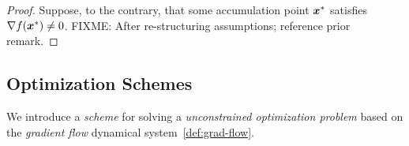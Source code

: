 \documentclass[10pt]{article}
\begin{document}
        \begin{proof}
            Suppose, to the contrary, that some accumulation point $\bm{x}^{*}$ satisfies
            $\nabla f(\bm{x}^{*})\neq 0$. FIXME: After re-structuring assumptions; reference
            prior remark.
        \end{proof}

        \newpage


    \subsection{Optimization Schemes}
        \label{intro:scheme}
        \medskip

        We introduce a \emph{scheme} for solving a \emph{unconstrained optimization problem} based on the \emph{gradient flow}
        dynamical system~\ref{def:grad-flow}.
\end{document}

